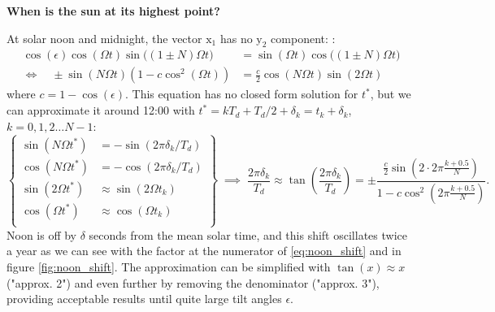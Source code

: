 \documentclass[12pt]{article}
\begin{document}
\textbf{When is the sun at its highest point?}

At solar noon and midnight, the vector $\mathrm{x}_1$ has no $\mathrm{y}_2$ component:
:
\begin{equation}
    \begin{aligned}
        \cos(\epsilon) \cos(\Omega t)\sin\big((1 \pm N)\Omega t\big)
            &= \sin(\Omega t) \cos\big((1\pm N)\Omega t\big)\\
        \iff \quad \pm \sin(N\Omega t)(1 - c \cos^2(\Omega t)) 
            &= \frac{c}{2} \cos(N\Omega t) \sin(2\Omega t)
    \end{aligned}
\end{equation}
where $c=1-\cos(\epsilon)$. This equation has no closed form solution for $t^*$,
but we can approximate it around 12:00 with $t^*=kT_d+T_d/2+\delta_k=t_k+\delta_k$, 
$k=0,1,2\ldots N-1$:
\begin{equation}
    \left\{
        \begin{aligned}
            \sin(N\Omega t^*) &= - \sin(2\pi\delta_k / T_d)\\
            \cos(N\Omega t^*) &= - \cos(2\pi\delta_k / T_d)\\
            \sin(2\Omega t^*) &\approx \sin(2\Omega t_k)\\
            \cos(\Omega t^*) &\approx \cos(\Omega t_k)\\
        \end{aligned}
    \right\} \; \implies \;
    \frac{2\pi \delta_k}{T_d} \approx \tan(\frac{2\pi \delta_k}{T_d}) = 
    \pm \frac{\tfrac{c}{2} \sin(2\cdot 2\pi \tfrac{k+0.5}{N})}{1-c \cos^2(2\pi \tfrac{k+0.5}{N})}.
    \label{eq:noon_shift}
\end{equation}
Noon is off by $\delta$ seconds from the mean solar time, and this shift
oscillates twice a year as we can see with the factor at the numerator of 
\eqref{eq:noon_shift} and in figure \ref{fig:noon_shift}. 
The approximation can be simplified with $\tan(x) \approx x$ 
("approx. 2") and even further by removing the denominator ("approx. 3"),
providing acceptable results until quite large tilt angles $\epsilon$.
\end{document}
